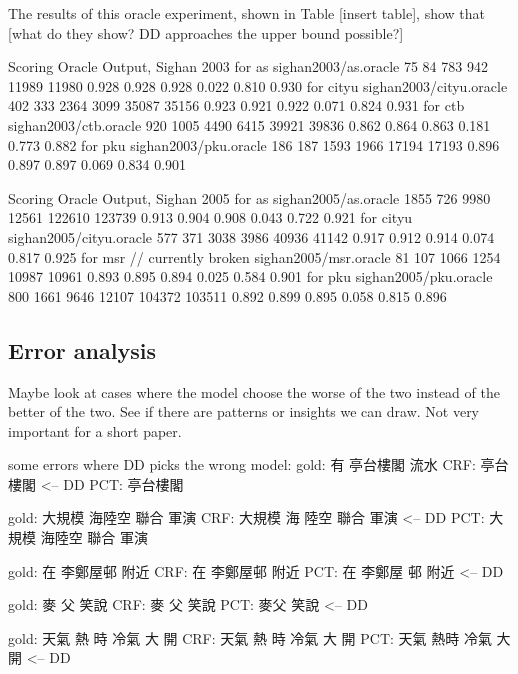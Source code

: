 The results of this oracle experiment, shown in Table [insert table], show that [what do they show? DD approaches the upper bound possible?]

Scoring Oracle Output, Sighan 2003
for as
	sighan2003/as.oracle	75	84	783	942	11989	11980	0.928	0.928	0.928	0.022	0.810	0.930
for cityu
	sighan2003/cityu.oracle	402	333	2364	3099	35087	35156	0.923	0.921	0.922	0.071	0.824	0.931
for ctb
	sighan2003/ctb.oracle	920	1005	4490	6415	39921	39836	0.862	0.864	0.863	0.181	0.773	0.882
for pku
	sighan2003/pku.oracle	186	187	1593	1966	17194	17193	0.896	0.897	0.897	0.069	0.834	0.901

Scoring Oracle Output, Sighan 2005
for as
	sighan2005/as.oracle	1855	726	9980	12561	122610	123739	0.913	0.904	0.908	0.043	0.722	0.921
for cityu
	sighan2005/cityu.oracle	577	371	3038	3986	40936	41142	0.917	0.912	0.914	0.074	0.817	0.925
for msr // currently broken
	sighan2005/msr.oracle	81	107	1066	1254	10987	10961	0.893	0.895	0.894	0.025	0.584	0.901
for pku
	sighan2005/pku.oracle	800	1661	9646	12107	104372	103511	0.892	0.899	0.895	0.058	0.815	0.896


\subsection{Error analysis}
Maybe look at cases where the model choose the worse of the two instead of the better of the two. See if there are patterns or insights we can draw. Not very important for a short paper.

some errors where DD picks the wrong model:
gold: 有 亭台樓閣 流水
CRF: 亭台 樓閣  <-- DD
PCT: 亭台樓閣

gold: 大規模 海陸空 聯合 軍演   
CRF: 大規模 海 陸空 聯合 軍演   <-- DD
PCT: 大規模 海陸空 聯合 軍演   


gold: 在 李鄭屋邨 附近
CRF: 在 李鄭屋邨 附近
PCT: 在 李鄭屋 邨 附近   <-- DD

gold: 麥 父 笑說
CRF:  麥 父 笑說
PCT: 麥父 笑說    <-- DD

gold: 天氣 熱 時 冷氣 大 開     
CRF: 天氣 熱 時 冷氣 大 開     
PCT: 天氣 熱時 冷氣 大 開     <-- DD
